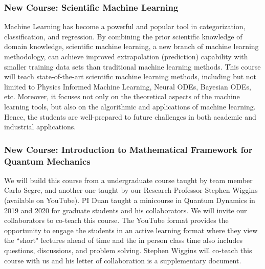 \documentclass[11pt]{NSFamsart}
\begin{document}

\subsubsection*{New Course: Scientific Machine Learning}
Machine Learning has become a powerful and popular tool in categorization, classification, and regression.  By combining the prior scientific knowledge of domain knowledge, scientific machine learning, a new branch of machine learning methodology, can achieve improved extrapolation (prediction) capability with smaller training data sets than traditional machine learning methods.  This course will teach state-of-the-art scientific machine learning methods, including but not limited to Physics Informed Machine Learning, Neural ODEs, Bayesian ODEs, etc.  Moreover, it focuses not only on the theoretical aspects of the machine learning tools, but also on the algorithmic and applications of machine learning.  Hence, the students are well-prepared to future challenges in both academic and industrial applications. 

 
\subsubsection*{New Course: Introduction to Mathematical Framework for Quantum Mechanics} We will build this course from  a   undergraduate course   taught by team member Carlo Segre, and another one taught by our Research Professor Stephen Wiggins (available on YouTube). PI Duan   taught a minicourse in Quantum Dynamics \cite{Gutzwiller1990ChaosIC, Holland1993TheQT,Lindgren2019QuantumMC,Micha2006QuantumDW} in 2019 and 2020 for graduate students and his collaborators.  We will invite our collaborators to co-teach this course. 
The YouTube format provides the opportunity to engage the students in an active learning format where they view the “short" lectures ahead of time and the in person class time  also includes  questions, discussions, and problem solving. Stephen Wiggins will co-teach this course with us and his letter of collaboration is a supplementary document.
\end{document}

